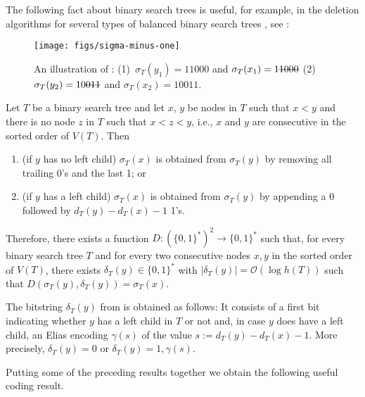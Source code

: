 \documentclass[kpfonts]{patmorin}
\newcommand{\Oh}{\mathcal{O}}
\begin{document}
The following fact about binary search trees is useful, for example, in the deletion algorithms for several types of balanced binary search trees \cite[Section~6.2.3]{morin:open}, see :

\begin{figure}
  \begin{center}
    \texttt{[image: figs/sigma-minus-one]}
  \end{center}
  \caption{An illustration of : (1)~$\sigma_T(y_1)=11000$ and $\sigma_T(x_1)=1\mbox{\sout{1000}}$ (2)~$\sigma_T(y_2)=10\mbox{\sout{011}}$ and $\sigma_T(x_2)=10011$.}
\end{figure}

\begin{obs}
  Let $T$ be a binary search tree and let $x$, $y$ be nodes in $T$ such that $x<y$ and there is no node $z$ in $T$ such that $x<z<y$, i.e., $x$ and $y$ are consecutive in the sorted order of $V(T)$.  Then
  \begin{enumerate}
    \item (if $y$ has no left child) $\sigma_T(x)$ is obtained from $\sigma_T(y)$ by removing all trailing 0's and the last 1; or
    \item (if $y$ has a left child) $\sigma_T(x)$ is obtained from $\sigma_T(y)$ by appending a 0 followed by $d_T(y)-d_T(x)-1$ 1's.
  \end{enumerate}
Therefore, there exists a function $D:(\{0,1\}^*)^2\to\{0,1\}^*$ such that, for every binary search tree $T$ and for every two consecutive nodes $x, y$ in the sorted order of $V(T)$, there exists $\delta_T(y) \in \{0,1\}^*$ with $|\delta_T(y)|=\Oh(\log h(T))$ such that
$D(\sigma_T(y),\delta_T(y))=\sigma_T(x)$.
\end{obs}

The bitstring $\delta_T(y)$ from  is obtained as follows: It consists of a first bit indicating whether $y$ has a left child in $T$ or not and, in case $y$ does have a left child, an Elias encoding $\gamma(s)$ of the value $s:=d_T(y)-d_T(x)-1$.  More precisely, $\delta_T(y) = 0$ or $\delta_T(y) = 1, \gamma(s)$.

Putting some of the preceding results together we obtain the following useful coding result.
\end{document}
